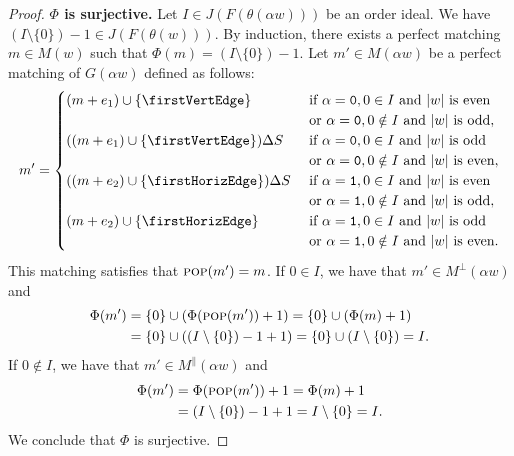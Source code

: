 \documentclass[a4paper,12pt]{amsart}
\newcommand{\0}{\mathtt{0}}
\newcommand{\1}{\mathtt{1}}
\newcommand{\2}{\mathtt{2}}
\newcommand{\3}{\mathtt{3}}
\newcommand{\carreplein}{{\perp}}
\newcommand{\carrevide}{{\parallel}}
\DeclareMathOperator{\pop}{\textsc{pop}}
\begin{document}
\begin{proof}
    \textbf{$\Phi$ is surjective.}
    Let $I\in J(F(\theta(\alpha w)))$ be an order ideal.
    We have $(I\setminus\{0\})-1 \in J(F(\theta(w)))$.
    By induction, there exists a perfect matching $m\in M(w)$ such that
    $\Phi(m)=(I\setminus\{0\})-1$.
    Let $m'\in M(\alpha w)$ be a perfect matching of $G(\alpha w)$ defined as follows:
    \[
        m'=
        \begin{cases}
            (m+e_1)\cup \{\firstVertEdge\}
                             & \text{ if } \alpha=\0, 0\in I \text{ and $|w|$ is even}\\
                             & \text{ or } \alpha=\0, 0\notin I \text{ and $|w|$ is odd},\\
            ((m+e_1)\cup \{\firstVertEdge\})\Delta S
                             & \text{ if } \alpha=\0, 0\in I \text{ and $|w|$ is odd}\\
                             & \text{ or } \alpha=\0, 0\notin I \text{ and $|w|$ is even},\\
            ((m+e_2)\cup \{\firstHorizEdge\})\Delta S
                             & \text{ if } \alpha=\1, 0\in I \text{ and $|w|$ is even}\\
                             & \text{ or } \alpha=\1, 0\notin I \text{ and $|w|$ is odd},\\
            (m+e_2)\cup \{\firstHorizEdge\}
                             & \text{ if } \alpha=\1, 0\in I \text{ and $|w|$ is odd}\\
                             & \text{ or } \alpha=\1, 0\notin I \text{ and $|w|$ is even}.
        \end{cases}
    \]
    This matching satisfies that $\pop(m')=m$.
    If $0\in I$, we have that $m'\in M^\carreplein(\alpha w)$ and
    \begin{align*}
        \Phi(m')
        &= \{0\} \cup (\Phi(\pop(m'))+1)
         = \{0\} \cup (\Phi(m)+1)\\
        &= \{0\} \cup ((I\setminus\{0\})-1+1)
         = \{0\} \cup (I\setminus\{0\})
        = I.
    \end{align*}
    If $0\notin I$, we have that $m'\in M^\carrevide(\alpha w)$ and
    \begin{align*}
        \Phi(m')
        &= \Phi(\pop(m'))+1
         = \Phi(m)+1\\
        &= (I\setminus\{0\})-1+1
         = I\setminus\{0\}
         = I.
    \end{align*}
    We conclude that $\Phi$ is surjective.


\end{proof}
\end{document}
